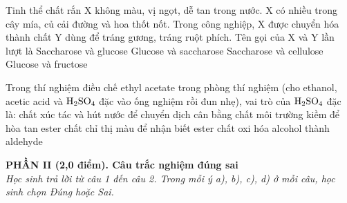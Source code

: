 \documentclass[11pt,a4paper]{article}
\begin{document}
\begin{ex}
Tinh thể chất rắn X không màu, vị ngọt, dễ tan trong nước. X có nhiều trong cây mía, củ cải đường và hoa thốt nốt. Trong công nghiệp, X được chuyển hóa thành chất Y dùng để tráng gương, tráng ruột phích. Tên gọi của X và Y lần lượt là
\choice
{\True Saccharose và glucose}
{Glucose và saccharose}
{Saccharose và cellulose}
{Glucose và fructose}



\end{ex}

\begin{ex}
Trong thí nghiệm điều chế ethyl acetate trong phòng thí nghiệm (cho ethanol, acetic acid và $\ce{H2SO4}$ đặc vào ống nghiệm rồi đun nhẹ), vai trò của $\ce{H2SO4}$ đặc là:
\choice
{\True chất xúc tác và hút nước để chuyển dịch cân bằng}
{chất môi trường kiềm để hòa tan ester}
{chất chỉ thị màu để nhận biết ester}
{chất oxi hóa alcohol thành aldehyde}



\end{ex}

\vspace{4pt}
\noindent
{\color{mainGreen}\textbf{\large PHẦN II (2,0 điểm). Câu trắc nghiệm đúng sai}}\\
\textit{\small Học sinh trả lời từ câu 1 đến câu 2. Trong mỗi ý a), b), c), d) ở mỗi câu, học sinh chọn Đúng hoặc Sai.}
\vspace{2pt}
\end{document}
